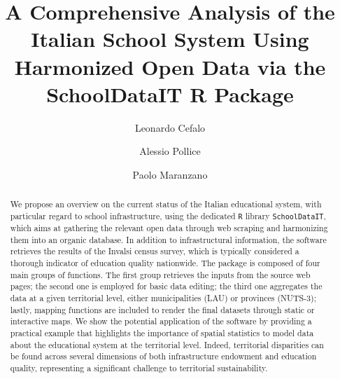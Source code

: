 \documentclass{article}%
\begin{document}
\title{A Comprehensive Analysis of the Italian School System Using Harmonized Open Data via the SchoolDataIT R Package}


\author[1]{Leonardo Cefalo }

\author[1]{Alessio Pollice}

\author[2]{Paolo Maranzano}





\maketitle
\begin{abstract}
We propose an overview on the current status of the Italian educational system, with particular regard to school infrastructure, using the dedicated \texttt{R} library \texttt{SchoolDataIT}, which aims at gathering the relevant open data through web scraping and harmonizing them into an organic database. In addition to infrastructural information, the software retrieves the results of the Invalsi census survey, which is typically considered a thorough indicator of education quality nationwide. The package is composed of four main groups of functions. The first group retrieves the inputs from the source web pages; the second one is employed for basic data editing; the third one aggregates the data at a given territorial level, either municipalities (LAU) or provinces (NUTS-3); lastly, mapping functions are included to render the final datasets through static or interactive maps. We show the potential application of the software by providing a practical example that highlights the importance of spatial statistics to model data about the educational system at the territorial level. Indeed, territorial disparities can be found across several dimensions of both infrastructure endowment and education quality, representing a significant challenge to territorial sustainability.
\end{abstract}
\end{document}
